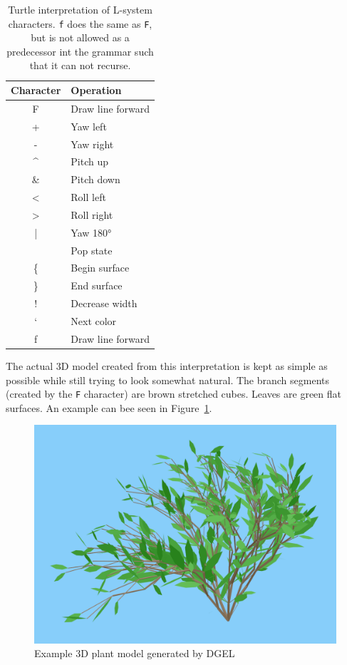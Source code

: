 \begin{table}
    \centering
    \begin{tabular}{| c | l |}
    \hline
    \textbf{Character} & \textbf{Operation} \\ \hline
    F & Draw line forward \\ \hline
    + & Yaw left \\ \hline
    - & Yaw right \\ \hline
    \textasciicircum & Pitch up \\ \hline
    \& & Pitch down \\ \hline
    < & Roll left \\ \hline
    > & Roll right \\ \hline
    | & Yaw 180° \\ \hline
    [ & Push state \\ \hline
    ] & Pop state \\ \hline
    \{ & Begin surface \\ \hline
    \} & End surface \\ \hline
    ! & Decrease width \\ \hline
    ` & Next color \\ \hline
    f & Draw line forward \\
    \hline
    \end{tabular}
    \caption[Turtle interpretation of L-system characters]{Turtle interpretation of \gls{L-system} characters. \texttt{f} does the same as \texttt{F}, but is not allowed as a predecessor int the grammar such that it can not recurse.}
    \label{tab:turtle-cmd}
\end{table}

The actual 3D model created from this interpretation is kept as simple as possible while still trying to look somewhat natural.
The \glspl{branch segment} (created by the \texttt{F} character) are brown stretched cubes.
Leaves are green flat surfaces.
An example can bee seen in Figure~\ref{fig:example-model}.

\begin{figure}
    \centering
    \includegraphics[width=1.0\textwidth]{figures/example-plant}
    \caption[Example 3D plant model generated by DGEL]{Example 3D plant model generated by \gls{DGEL}}
    \label{fig:example-model}
\end{figure}

